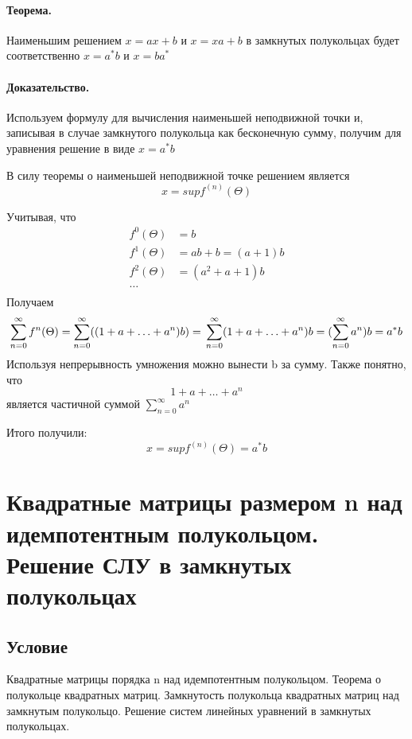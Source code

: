 \documentclass{report}
\begin{document}
\paragraph*{Теорема.}
Наименьшим решением $x = ax + b$ и  $x = xa + b$ в замкнутых полукольцах
будет соответственно  $x=a^{*}b$ и $x=ba^{*}$

\paragraph*{Доказательство.}
Используем формулу для вычисления наименьшей неподвижной точки и, записывая
в случае замкнутого полукольца как бесконечную сумму,
получим для уравнения решение в виде $x = a^{*}b$

\medskip

В силу теоремы о наименьшей неподвижной точке решением является
\[
x = supf^{(n)}(\Theta)
\] 


Учитывая, что
\[
\begin{align*}
	f^{0}(\Theta) &= b \\
	f^{1}(\Theta) &= ab + b = (a + 1)b \\
	f^{2}(\Theta) &= (a^2 + a + 1)b \\
	\ldots \\
\end{align*}

\] 
Получаем
\[
\sum\limits_{n=0}^{\infty}f^{n}(\Theta) = \sum\limits_{n=0}^{\infty}((1 + a + \ldots + a^{n})b) = \\
\sum\limits_{n=0}^{\infty}(1 + a + \ldots + a^{n})b = (\sum\limits_{n=0}^{\infty}a^{n})b = a^{*}b
\] 
Используя непрерывность умножения можно вынести b за сумму. Также понятно, что
\[
1 + a + \ldots + a^{n}
\] 
является частичной суммой $\sum\limits_{n=0}^{\infty}a^{n} $

\medskip

Итого получили:
\[
x = supf^{(n)}(\Theta) = a^{*}b
\]

\newpage

\section{Квадратные матрицы размером n над идемпотентным полукольцом.
  Решение СЛУ в замкнутых полукольцах}
\subsection{Условие}
Квадратные матрицы порядка n над идемпотентным полукольцом. Теорема о
полукольце квадратных матриц. Замкнутость полукольца квадратных матриц над
замкнутым полукольцо. Решение систем линейных уравнений в замкнутых
полукольцах.
\end{document}
